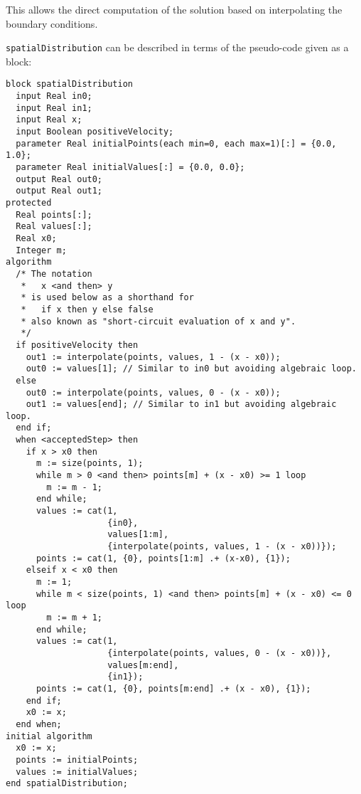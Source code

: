 This allows the direct computation of the solution based on interpolating the boundary conditions.

\lstinline!spatialDistribution! can be described in terms of the pseudo-code given as a block:
\begin{lstlisting}[language=modelica]
block spatialDistribution
  input Real in0;
  input Real in1;
  input Real x;
  input Boolean positiveVelocity;
  parameter Real initialPoints(each min=0, each max=1)[:] = {0.0, 1.0};
  parameter Real initialValues[:] = {0.0, 0.0};
  output Real out0;
  output Real out1;
protected
  Real points[:];
  Real values[:];
  Real x0;
  Integer m;
algorithm
  /* The notation
   *   x <and then> y
   * is used below as a shorthand for
   *   if x then y else false
   * also known as "short-circuit evaluation of x and y".
   */
  if positiveVelocity then
    out1 := interpolate(points, values, 1 - (x - x0));
    out0 := values[1]; // Similar to in0 but avoiding algebraic loop.
  else
    out0 := interpolate(points, values, 0 - (x - x0));
    out1 := values[end]; // Similar to in1 but avoiding algebraic loop.
  end if;
  when <acceptedStep> then
    if x > x0 then
      m := size(points, 1);
      while m > 0 <and then> points[m] + (x - x0) >= 1 loop
        m := m - 1;
      end while;
      values := cat(1,
                    {in0},
                    values[1:m],
                    {interpolate(points, values, 1 - (x - x0))});
      points := cat(1, {0}, points[1:m] .+ (x-x0), {1});
    elseif x < x0 then
      m := 1;
      while m < size(points, 1) <and then> points[m] + (x - x0) <= 0 loop
        m := m + 1;
      end while;
      values := cat(1,
                    {interpolate(points, values, 0 - (x - x0))},
                    values[m:end],
                    {in1});
      points := cat(1, {0}, points[m:end] .+ (x - x0), {1});
    end if;
    x0 := x;
  end when;
initial algorithm
  x0 := x;
  points := initialPoints;
  values := initialValues;
end spatialDistribution;
\end{lstlisting}


